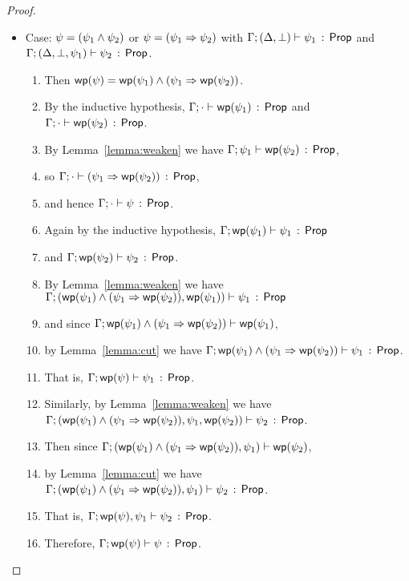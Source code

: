 \documentclass[10pt,a4paper]{article}
\begin{document}
\begin{proof}
\begin{itemize}
      
  \item Case: $\psi = (\psi_1 \wedge \psi_2)$ or $\psi = (\psi_1 \Rightarrow \psi_2)$ with
       $\Gamma;(\Delta,\bot) \vdash \psi_1\, :\, \mathsf{Prop}$ and 
              $\Gamma;(\Delta,\bot,\psi_1) \vdash \psi_2\, :\, \mathsf{Prop}$.
       \begin{enumerate}
       \item Then $\mathop{\mathsf{wp}}(\psi) = \mathop{\mathsf{wp}}(\psi_1) \wedge (\psi_1 \Rightarrow \mathop{\mathsf{wp}}(\psi_2))$.
       \item By the inductive hypothesis,
         $\Gamma;\cdot \vdash \mathop{\mathsf{wp}}(\psi_1)\, :\, \mathsf{Prop}$
         and $\Gamma;\cdot \vdash \mathop{\mathsf{wp}}(\psi_2)\, :\, \mathsf{Prop}$.
       \item 
       		By Lemma~\ref{lemma:weaken} we have 
			$\Gamma;\psi_1 \vdash \mathop{\mathsf{wp}}(\psi_2)\, :\, \mathsf{Prop}$,
		\item
			so $\Gamma;\cdot \vdash (\psi_1 \Rightarrow \mathop{\mathsf{wp}}(\psi_2))\, :\, \mathsf{Prop}$,
		\item
		 	and hence $\Gamma;\cdot \vdash \psi\, :\, \mathsf{Prop}$.
	    \item
	        Again by the inductive hypothesis,
	        $\Gamma;\mathop{\mathsf{wp}}(\psi_1) \vdash \psi_1\, :\, \mathsf{Prop}$
	    \item
	        and $\Gamma;\mathop{\mathsf{wp}}(\psi_2) \vdash \psi_2\, :\, \mathsf{Prop}$.
	    \item
	        By Lemma~\ref{lemma:weaken} we have
	        $\Gamma;(\mathop{\mathsf{wp}}(\psi_1) \wedge (\psi_1 \Rightarrow \mathop{\mathsf{wp}}(\psi_2)),\mathop{\mathsf{wp}}(\psi_1)) \vdash \psi_1\, :\, \mathsf{Prop}$
	    \item
	        and since
	        $\Gamma;\mathop{\mathsf{wp}}(\psi_1) \wedge (\psi_1 \Rightarrow \mathop{\mathsf{wp}}(\psi_2)) \vdash \mathop{\mathsf{wp}}(\psi_1)$,
	    \item
	        by Lemma~\ref{lemma:cut} we have
	        	$\Gamma;\mathop{\mathsf{wp}}(\psi_1) \wedge (\psi_1 \Rightarrow \mathop{\mathsf{wp}}(\psi_2)) \vdash \psi_1\, :\, \mathsf{Prop}$.
	    \item
	        That is, $\Gamma;\mathop{\mathsf{wp}}(\psi) \vdash \psi_1\, :\, \mathsf{Prop}$.
	    \item
	        Similarly, by Lemma~\ref{lemma:weaken} we have
	        $\Gamma;(\mathop{\mathsf{wp}}(\psi_1) \wedge (\psi_1 \Rightarrow \mathop{\mathsf{wp}}(\psi_2)),\psi_1,\mathop{\mathsf{wp}}(\psi_2)) \vdash \psi_2\, :\, \mathsf{Prop}$.
	    \item 
	        Then since
	        $\Gamma;(\mathop{\mathsf{wp}}(\psi_1) \wedge (\psi_1 \Rightarrow \mathop{\mathsf{wp}}(\psi_2)),\psi_1) \vdash \mathop{\mathsf{wp}}(\psi_2)$,
	    \item
	        by Lemma~\ref{lemma:cut} we have
	        $\Gamma;(\mathop{\mathsf{wp}}(\psi_1) \wedge (\psi_1 \Rightarrow \mathop{\mathsf{wp}}(\psi_2)),\psi_1) \vdash \psi_2\, :\, \mathsf{Prop}$.
	    \item
	        That is,
	        $\Gamma;\mathop{\mathsf{wp}}(\psi),\psi_1 \vdash \psi_2\, :\, \mathsf{Prop}$.
	    \item
	        Therefore,
	        $\Gamma;\mathop{\mathsf{wp}}(\psi) \vdash \psi\, :\, \mathsf{Prop}$.    
       \end{enumerate}
  \end{itemize}
\end{proof}
\end{document}
